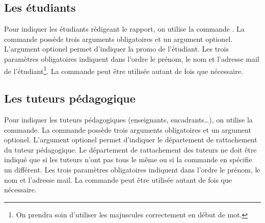 \documentclass[overfullbox,hideweeklyreports,noseparatecontributorspage,nodate]{polytech/polytech}
\begin{document}
\subsection{Les étudiants}

Pour indiquer les étudiants rédigeant le rapport, on utilise la commande \latexcode{\\student}. La commande possède trois arguments obligatoires et un argument optionel. L'argument optionel permet d'indiquer la promo de l'étudiant. Les trois paramètres obligatoires indiquent dans l'ordre le prénom, le nom et l'adresse mail de l'étudiant\footnote{On prendra soin d'utiliser les majuscules correctement en début de mot.}. La commande  \latexcode{\\student} peut être utilisée autant de fois que nécessaire.

\begin{latexsource}
\end{latexsource}

\subsection{Les tuteurs pédagogique}

Pour indiquer les tuteurs pédagogiques (enseignants, encadrants\ldots), on utilise la commande\linebreak \latexcode{\\academicsupervisor}. La commande possède trois arguments obligatoires et un argument optionel. L'argument optionel permet d'indiquer le département de rattachement du tuteur pédagogique. Le département de rattachement des tuteurs ne doit être indiqué que si les tuteurs n'ont pas tous le même ou si la commande \latexcode{\\schooldepartment} en spécifie un différent. Les trois paramètres obligatoires indiquent dans l'ordre le prénom, le nom et l'adresse mail. La commande \linebreak \latexcode{\\academicsupervisor} peut être utilisée autant de fois que nécessaire.

\begin{latexsource}
\end{latexsource}
\end{document}

